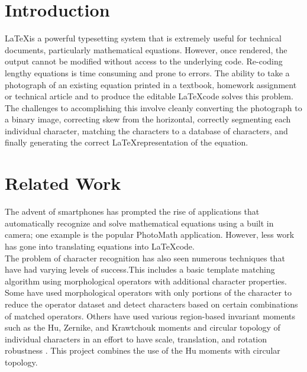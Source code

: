 \documentclass[journal]{IEEEtran}
\begin{document}
\section{Introduction}
% 
% 
% 
% 
\LaTeX is a powerful typesetting system that is extremely useful for technical documents, particularly mathematical equations. However, once rendered, the output cannot be modified without access to the underlying code. Re-coding lengthy equations is time consuming and prone to errors. The ability to take a photograph of an existing equation printed in a textbook, homework assignment or technical article and to produce the editable \LaTeX code solves this problem. The challenges to accomplishing this involve cleanly converting the photograph to a binary image, correcting skew from the horizontal, correctly segmenting each individual character, matching the characters to a database of characters, and finally generating the correct \LaTeX representation of the equation.

\section{Related Work}
The advent of smartphones has prompted the rise of applications that automatically recognize and solve mathematical equations using a built in camera; one example is the popular PhotoMath application\cite{PhotoMath:photomath}. However, less work has gone into translating equations into \LaTeX code.\\
The problem of character recognition has also seen numerous techniques that have had varying levels of success.This includes a basic template matching algorithm using morphological operators with additional character properties\cite{Naqvi:article_typical}. Some have used morphological operators with only portions of the character to reduce the operator dataset and detect characters based on certain combinations of matched operators\cite{Pradhan:article_typical}. Others have used various region-based invariant moments such as the Hu, Zernike, and Krawtchouk moments\cite{Potocnik:article_typical} and circular topology of individual characters in an effort to have scale, translation, and rotation robustness \cite{Torres-Mendez:article_typical}. This project combines the use of the Hu moments with circular topology.
\end{document}
